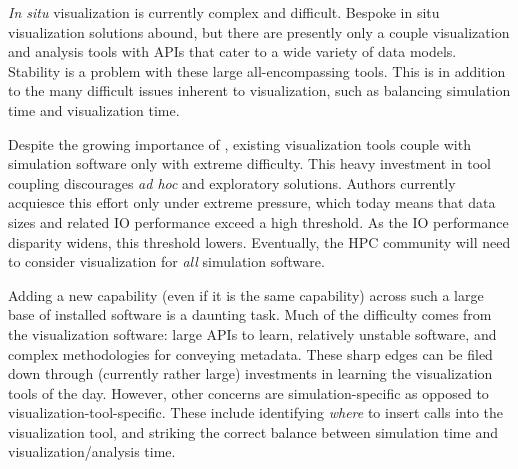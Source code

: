 \textit{In situ} visualization is currently complex and difficult.
Bespoke in situ visualization solutions abound, but there are presently
only a
couple visualization and analysis tools with \insitu{} APIs that
cater to a wide variety of data models.  Stability is a problem with
these large all-encompassing tools.  This is in addition to the many
difficult
issues inherent to \insitu{} visualization, such as balancing
simulation time and visualization time.

Despite the growing importance of \insitu{}, existing visualization
tools couple with simulation software only with extreme difficulty.
This heavy
investment in tool coupling discourages \textit{ad hoc} and exploratory
solutions.  Authors currently acquiesce this effort only under extreme
pressure, which today means that data sizes and related IO performance
exceed a high threshold.  As the IO performance disparity widens, this
threshold lowers.  Eventually, the HPC community will need to consider
\insitu{} visualization for \emph{all} simulation software.

Adding a new capability (even if it is the same capability) across such
a large base of installed software is a daunting task.  Much of the
difficulty comes from the visualization software: large APIs to learn,
relatively unstable software, and complex methodologies for conveying
metadata.  These sharp edges can be filed down through (currently
rather large) investments in learning the visualization tools of the
day.  However, other concerns are simulation-specific as opposed to
visualization-tool-specific.  These include identifying \emph{where}
to insert calls into the visualization tool, and striking the correct
balance between simulation time and visualization/analysis time.



